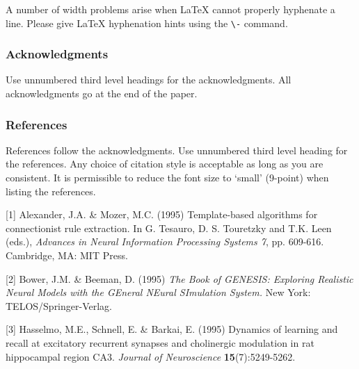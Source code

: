 \documentclass{article}
\theoremstyle{plain}
\begin{document}
A number of width problems arise when LaTeX cannot properly hyphenate a
line. Please give LaTeX hyphenation hints using the \verb+\-+ command.


\subsubsection*{Acknowledgments}

Use unnumbered third level headings for the acknowledgments. All
acknowledgments go at the end of the paper.

\subsubsection*{References}

References follow the acknowledgments. Use unnumbered third level heading for
the references. Any choice of citation style is acceptable as long as you are
consistent. It is permissible to reduce the font size to `small' (9-point) 
when listing the references.

\small{
[1] Alexander, J.A. \& Mozer, M.C. (1995) Template-based algorithms
for connectionist rule extraction. In G. Tesauro, D. S. Touretzky
and T.K. Leen (eds.), {\it Advances in Neural Information Processing
Systems 7}, pp. 609-616. Cambridge, MA: MIT Press.

[2] Bower, J.M. \& Beeman, D. (1995) {\it The Book of GENESIS: Exploring
Realistic Neural Models with the GEneral NEural SImulation System.}
New York: TELOS/Springer-Verlag.

[3] Hasselmo, M.E., Schnell, E. \& Barkai, E. (1995) Dynamics of learning
and recall at excitatory recurrent synapses and cholinergic modulation
in rat hippocampal region CA3. {\it Journal of Neuroscience}
{\bf 15}(7):5249-5262.
}
\fi
\end{document}

